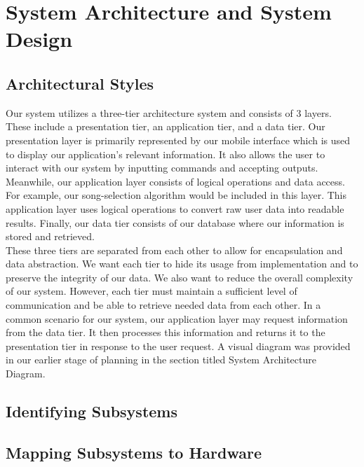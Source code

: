 \documentclass[letterpaper,english, 12pt]{scrreprt}
\begin{document}
\chapter{System Architecture and System Design}

\section{Architectural Styles}

Our system utilizes a three-tier architecture system and consists of 3 layers. These include a presentation tier, an application tier, and a data tier. Our presentation layer is primarily represented by our mobile interface which is used to display our application’s relevant information. It also allows the user to interact with our system by inputting commands and accepting outputs. Meanwhile, our application layer consists of logical operations and data access. For example, our song-selection algorithm would be included in this layer. This application layer uses logical operations to convert raw user data into readable results. Finally, our data tier consists of our database where our information is stored and retrieved. \\

These three tiers are separated from each other to allow for encapsulation and data abstraction. We want each tier to hide its usage from implementation and to preserve the integrity of our data. We also want to reduce the overall complexity of our system. However, each tier must maintain a sufficient level of communication and be able to retrieve needed data from each other. In a common scenario for our system, our application layer may request information from the data tier. It then processes this information and returns it to the presentation tier in response to the user request. A visual diagram was provided in our earlier stage of planning in the section titled System Architecture Diagram.


\section{Identifying Subsystems}

\section{Mapping Subsystems to Hardware}
\end{document}
